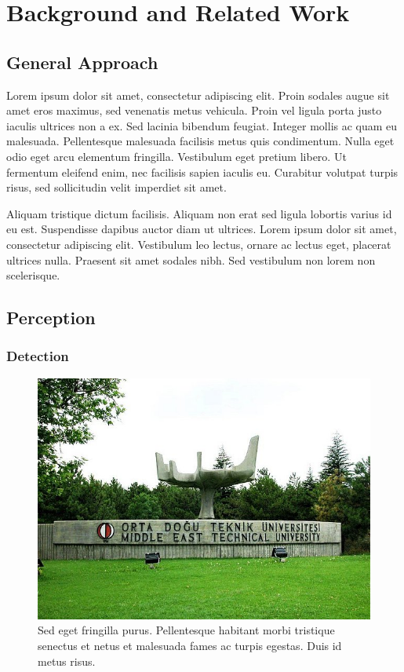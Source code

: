 \chapter{Background and Related Work}
\label{chp:b2}

\section{General Approach}
Lorem ipsum dolor sit amet, consectetur adipiscing elit. Proin sodales augue
sit amet eros maximus, sed venenatis metus vehicula. Proin vel ligula porta
justo iaculis ultrices non a ex. Sed lacinia bibendum feugiat. Integer mollis
ac quam eu malesuada. Pellentesque malesuada facilisis metus quis condimentum.
Nulla eget odio eget arcu elementum fringilla. Vestibulum eget pretium libero.
Ut fermentum eleifend enim, nec facilisis sapien iaculis eu. Curabitur volutpat
turpis risus, sed sollicitudin velit imperdiet sit amet.

Aliquam tristique dictum facilisis. Aliquam non erat sed ligula lobortis varius
id eu est. Suspendisse dapibus auctor diam ut ultrices. Lorem ipsum dolor sit
amet, consectetur adipiscing elit. Vestibulum leo lectus, ornare ac lectus
eget, placerat ultrices nulla. Praesent sit amet sodales nibh. Sed vestibulum
non lorem non scelerisque.

\section{Perception}

\subsection{Detection}

\begin{figure}[h]
\centering
\includegraphics[width=.8\textwidth]{figures/bilim_agaci.jpg}
\caption{Sed eget fringilla purus. Pellentesque habitant morbi tristique
senectus et netus et malesuada fames ac turpis egestas. Duis id metus risus. }
\label{fig:sample}
\end{figure}

